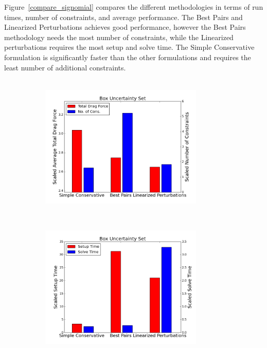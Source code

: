 Figure~\ref{compare_signomial} compares the different methodologies in terms of run times, number of constraints, and average performance. The Best Pairs and Linearized Perturbations achieves good performance, however the Best Pairs methodology needs the most number of constraints, while the Linearized perturbations requires the most setup and solve time. The Simple Conservative formulation is significantly faster than the other formulations and requires the least number of additional constraints.
\ \\
\ \\

\begin{figure}[ht]
    \centering
    \captionsetup{justification=centering, font=small}
    \begin{subfigure}{0.499\textwidth}
        \centering
        \includegraphics[height=2.3in]{signomial_simple_flight/box.png}
    \end{subfigure}%
    ~ 
    \begin{subfigure}{0.49\textwidth}
        \centering
        \includegraphics[height=2.3in]{signomial_simple_flight/box_times.png}
    \end{subfigure}
    ~
    \begin{subfigure}{0.499\textwidth}
        \centering

\end{subfigure}
\end{figure}
